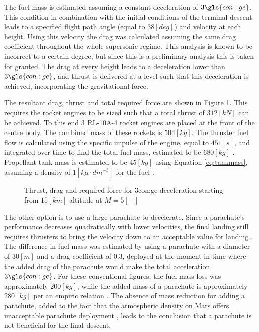 The fuel mass is estimated assuming a constant deceleration of $3 \gls{con:ge}$. This condition in combination with the initial conditions of the terminal descent leads to a specified flight path angle (equal to $38 \left[deg\right]$) and velocity at each height. Using this velocity the drag was calculated assuming the same drag coefficient throughout the whole supersonic regime. This analysis is known to be incorrect to a certain degree, but since this is a preliminary analysis this is taken for granted. The drag at every height leads to a deceleration lower than $3 \gls{con:ge}$, and thrust is delivered at a level such that this deceleration is achieved, incorporating the gravitational force. 

The resultant drag, thrust and total required force are shown in Figure \ref{fig:TDforce}. This requires the rocket engines to be sized such that a total thrust of $312 \left[kN\right]$ can be achieved. To this end 3 RL-10A-4 rocket engines are placed at the front of the centre body. The combined mass of these rockets is $504 \left[kg\right]$. The thruster fuel flow is calculated using the specific impulse of the engine, equal to $451 \left[s\right]$, and integrated over time to find the total fuel mass, estimated to be $680 \left[kg\right]$ \cite[p.538]{Wertz2011}. Propellant tank mass is estimated to be $45 \left[kg\right]$ using Equation \ref{eq:tankmass}, assuming a density of $1 \left[kg\cdot dm^{-3}\right]$ for the fuel \cite[p.543]{Wertz2011}.

\begin{figure}[h]
	\centering
	\setlength{} 
	\setlength{}
	
	\caption{Thrust, drag and required force for 3\gls{con:ge} deceleration starting from $15 \left[km\right]$ altitude at $M=5 \left[-\right]$}
	\label{fig:TDforce}
\end{figure}


The other option is to use a large parachute to decelerate. Since a parachute's performance decreases quadratically with lower velocities, the final landing still requires thrusters to bring the velocity down to an acceptable value for landing \cite{Braun2007}. The difference in fuel mass was estimated by using a parachute with a diameter of $30 \left[m\right]$ and a drag coefficient of $0.3$, deployed at the moment in time where the added drag of the parachute would make the total acceleration $3 \gls{con:ge}$. For these conventional figures, the fuel mass loss was approximately $200 \left[kg\right]$, while the added mass of a parachute is approximately $280 \left[kg\right]$ per an empiric relation \cite{Anderson1969}. The absence of mass reduction for adding a parachute, added to the fact that the atmospheric density on Mars offers unacceptable parachute deployment \cite{Korzun2009}, leads to the conclusion that a parachute is not beneficial for the final descent.

